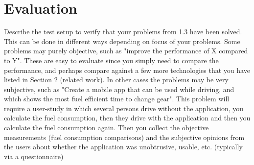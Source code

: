 \section{Evaluation}
Describe the test setup to verify that your problems from 1.3 have been solved. This can be done in different ways depending on focus of your problems. Some problems may purely objective, such as "improve the performance of X compared to Y". These are easy to evaluate since you simply need to compare the performance, and perhaps compare against a few more technologies that you have listed in Section 2 (related work). In other cases the problems may be very subjective, such as "Create a mobile app that can be used while driving, and which shows the most fuel efficient time to change gear". This problem will require a user-study in which several persons drive without the application, you calculate the fuel consumption, then they drive with the application and then you calculate the fuel consumption again. Then you collect the objective measurements (fuel consumption comparisons) and the subjective opinions from the users about whether the application was unobtrusive, usable, etc. (typically via a questionnaire)